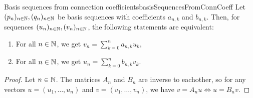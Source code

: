 \documentclass[language=english]{../../Template/TemplateLecture}
\begin{document}
\begin{thm}{Basis sequences from connection coefficients}{basisSequencesFromConnCoeff}
    Let $(p_n)_{n \in \mathbb{N}}, (q_n)_{n \in \mathbb{N}}$ be basis sequences with coefficients $a_{n,k}$ and $b_{n,k}$. Then, for sequences $(u_n)_{n \in \mathbb{N}}, (v_n)_{n \in \mathbb{N}}$, the following statements are equivalent:
    \begin{enumerate}[$(i)$]
        \item For all $n \in \mathbb{N}$, we get $v_n = \sum_{k = 0}^n a_{n,k} u_k$,
        \item For all $n \in \mathbb{N}$, we get $u_n = \sum_{k = 0}^n b_{n,k} v_k$. 
    \end{enumerate}
\end{thm}

\begin{proof}
    Let $n \in \mathbb{N}$. The matrices $A_n$ and $B_n$ are inverse to eachother, so for any vectors $u = (u_1,\ldots,u_n)$ and $v = (v_1, \ldots, v_n)$, we have $v = A_n u \iff u = B_n v$.
\end{proof}
\end{document}
